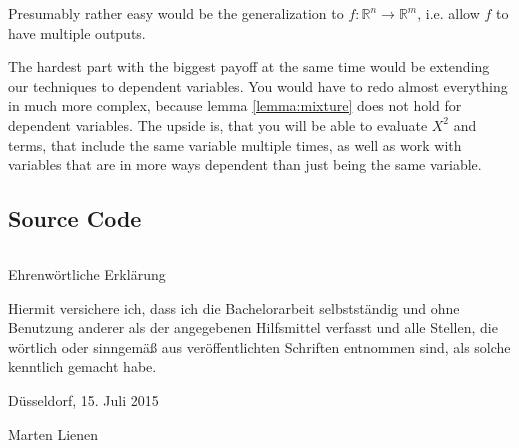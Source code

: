 \documentclass[11pt,a4paper]{book}
\begin{document}
Presumably rather easy would be the generalization to
$f : \mathbb{R}^{n} \rightarrow \mathbb{R}^{m}$, i.e. allow $f$ to have multiple
outputs.

The hardest part with the biggest payoff at the same time would be extending our
techniques to dependent variables. You would have to redo almost everything in
much more complex, because lemma \ref{lemma:mixture} does not hold for dependent
variables. The upside is, that you will be able to evaluate $X^{2}$ and terms,
that include the same variable multiple times, as well as work with variables
that are in more ways dependent than just being the same variable.

\begin{appendices}
  \chapter{Source Code}
  \label{ch:source}

  \inputminted{julia}{src/Transforms.jl}
\end{appendices}

\printbibliography

\pagestyle{empty}
\cleardoublepage

\vspace*{10em}
{\LARGE Ehrenwörtliche Erklärung}
\vspace{1em}

Hiermit versichere ich, dass ich die Bachelorarbeit selbstständig und ohne
Benutzung anderer als der angegebenen Hilfsmittel verfasst und alle Stellen, die
wörtlich oder sinngemäß aus veröffentlichten Schriften entnommen sind, als
solche kenntlich gemacht habe.

\vspace{5em}

\begin{minipage}{0.4\textwidth}
  \begin{flushleft}
    Düsseldorf, 15. Juli 2015
  \end{flushleft}
\end{minipage}
\hfill
\begin{minipage}{0.4\textwidth}
  \begin{flushright}
    Marten Lienen
  \end{flushright}
\end{minipage}
\end{document}
